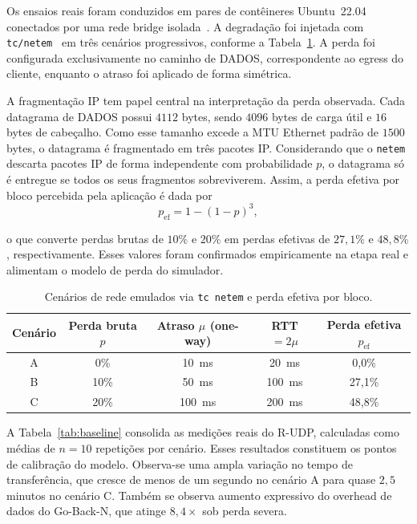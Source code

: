 \documentclass[12pt]{article}
\begin{document}
Os ensaios reais foram conduzidos em pares de contêineres Ubuntu~22.04 conectados por uma
rede bridge isolada~\cite{merkel2014}. A degradação foi injetada com
\texttt{tc/netem}~\cite{hemminger2005} em três cenários progressivos, conforme a
Tabela~\ref{tab:cenarios}. A perda foi configurada exclusivamente no caminho de DADOS,
correspondente ao egress do cliente, enquanto o atraso foi aplicado de forma simétrica.

A fragmentação IP tem papel central na interpretação da perda observada. Cada datagrama de
DADOS possui $4112$ bytes, sendo $4096$ bytes de carga útil e $16$ bytes de cabeçalho. Como
esse tamanho excede a MTU Ethernet padrão de $1500$ bytes, o datagrama é fragmentado em
três pacotes IP. Considerando que o \texttt{netem} descarta pacotes IP de forma
independente com probabilidade $p$, o datagrama só é entregue se todos os seus fragmentos
sobreviverem. Assim, a perda efetiva por bloco percebida pela aplicação é dada por
\begin{equation}
  p_{\text{ef}} = 1 - (1-p)^3,
  \label{eq:frag}
\end{equation}

o que converte perdas brutas de $10\%$ e $20\%$ em perdas efetivas de $27{,}1\%$ e
$48{,}8\%$, respectivamente. Esses valores foram confirmados empiricamente na etapa real e
alimentam o modelo de perda do simulador.

\begin{table}[ht]
\centering
\caption{Cenários de rede emulados via \texttt{tc netem} e perda efetiva por bloco.}
\label{tab:cenarios}
\begin{tabular}{ccccc}
\toprule
\textbf{Cenário} & \textbf{Perda bruta $p$} & \textbf{Atraso $\mu$ (one-way)} &
\textbf{RTT $=2\mu$} & \textbf{Perda efetiva $p_{\text{ef}}$} \\
\midrule
A & 0\%  & 10~ms  & 20~ms  & 0{,}0\% \\
B & 10\% & 50~ms  & 100~ms & 27{,}1\% \\
C & 20\% & 100~ms & 200~ms & 48{,}8\% \\
\bottomrule
\end{tabular}
\end{table}

A Tabela~\ref{tab:baseline} consolida as medições reais do R-UDP, calculadas como médias
de $n=10$ repetições por cenário. Esses resultados constituem os pontos de calibração do
modelo. Observa-se uma ampla variação no tempo de transferência, que cresce de menos de um
segundo no cenário A para quase $2{,}5$ minutos no cenário C. Também se observa aumento
expressivo do overhead de dados do Go-Back-N, que atinge $8{,}4\times$ sob perda severa.
\end{document}
